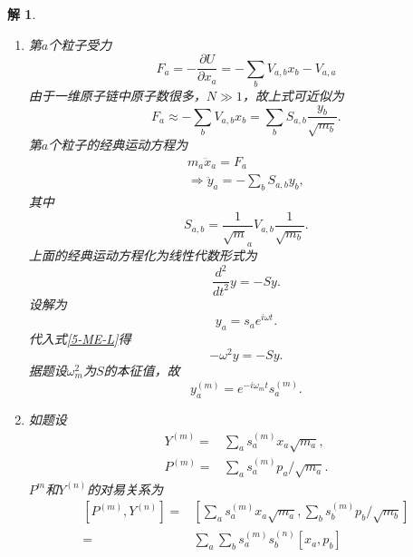 \documentclass[UTF8,10pt,a4paper]{article}
\theoremstyle{Problem}
\theoremstyle{Solution}
\newtheorem*{sol}{解}
\begin{document}
\begin{sol}
    \begin{enumerate}
        \item[i.] 第$a$个粒子受力
        \begin{equation}
            F_a=-\frac{\partial U}{\partial x_a}=-\sum_bV_{a,b}x_b-V_{a,a}
        \end{equation}
        由于一维原子链中原子数很多，$N\gg 1$，故上式可近似为
        \begin{equation}
            F_a\approx-\sum_bV_{a,b}x_b=\sum_bS_{a,b}\frac{y_b}{\sqrt{m_b}}.
        \end{equation}
        第$a$个粒子的经典运动方程为
        \begin{gather}
            m_a\ddot{x}_a=F_a\\
            \Longrightarrow\ddot{y}_a=-\sum_bS_{a,b}y_b,
        \end{gather}
        其中
        \begin{equation}
            S_{a,b}=\frac{1}{\sqrt{m}_a}V_{a,b}\frac{1}{\sqrt{m_b}}.
        \end{equation}
        上面的经典运动方程化为线性代数形式为
        \begin{equation}
            \label{5-ME-L}
            \frac{d^2}{dt^2}y=-Sy.
        \end{equation}
        设解为
        \begin{equation}
            y_a=s_ae^{i\omega t}.
        \end{equation}
        代入式\eqref{5-ME-L}得
        \begin{equation}
            -\omega^2y=-Sy.
        \end{equation}
        据题设$\omega_m^2$为$S$的本征值，故
        \begin{equation}
            y_a^{(m)}=e^{-i\omega_mt}s_a^{(m)}.
        \end{equation}
        \item[ii.] 如题设
        \begin{align}
            Y^{(m)}=&\sum_as_a^{(m)}x_a\sqrt{m_a},\\
            P^{(m)}=&\sum_as_a^{(m)}p_a/\sqrt{m_a}.
        \end{align}
        $P^{m}$和$Y^{(n)}$的对易关系为
        \begin{align}
            \nonumber[P^{(m)},Y^{(n)}]=&[\sum_as_a^{(m)}x_a\sqrt{m_a},\sum_bs_b^{(m)}p_b/\sqrt{m_b}]\\
            \nonumber=&\sum_a\sum_bs_a^{(m)}s_b^{(n)}[x_a,p_b]\\

\end{align}
\end{enumerate}
\end{sol}
\end{document}
